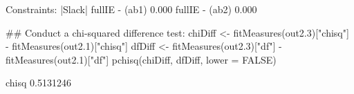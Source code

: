\begin{Schunk}
\begin{Soutput}
Constraints:
                                               |Slack|
    fullIE - (ab1)                               0.000
    fullIE - (ab2)                               0.000
\end{Soutput}
\begin{Sinput}
 ## Conduct a chi-squared difference test:
 chiDiff <- fitMeasures(out2.3)["chisq"] - 
     fitMeasures(out2.1)["chisq"]
 dfDiff <- fitMeasures(out2.3)["df"] - 
     fitMeasures(out2.1)["df"]
 pchisq(chiDiff, dfDiff, lower = FALSE)
\end{Sinput}
\begin{Soutput}
    chisq 
0.5131246 
\end{Soutput}
\end{Schunk}
